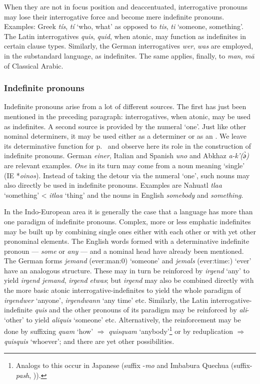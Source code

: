 When they are not in focus position and deaccentuated, interrogative pronouns may lose their interrogative force and become mere indefinite pronouns. Examples: Greek \textit{tís}, \textit{tí} ‘who, what’ as opposed to \textit{tis}, \textit{ti} ‘someone, something’. The Latin interrogatives \textit{quis}, \textit{quid}, when atonic, may function as indefinites in certain clause types. Similarly, the German interrogatives \textit{wer}, \textit{was} are employed, in the substandard language, as indefinites. The same applies, finally, to \textit{man}, \textit{m\=a} of Classical Arabic.

\subsubsection{Indefinite pronouns}
Indefinite pronouns arise from a lot of different sources. The first has just been mentioned in the preceding paragraph: interrogatives, when atonic, may be used as indefinites. A second source is provided by the numeral ‘one’. Just like other nominal determiners, it may be used either as a determiner or as an \np. We leave its determinative function for p.~\pageref{p56} and observe here its role in the construction of indefinite pronouns. German \textit{einer}, Italian and Spanish \textit{uno} and Abkhaz \textit{a-k'(\`ә)} are relevant examples. \textit{One} in its turn may come from a noun meaning ‘single’ (IE *\textit{oinos}). Instead of taking the detour via the numeral ‘one’, such nouns may also directly be used in indefinite pronouns. Examples are Nahuatl \textit{tlaa} ‘something’ {\textless} \textit{itlaa} ‘thing’ and the nouns in English \textit{somebody} and \textit{something}.

In the Indo-European area it is generally the case that a language has more than one paradigm of indefinite pronouns. Complex, more or less emphatic indefinites may be built up by combining single ones either with each other or with yet other pronominal elements. The English words formed with a determinative indefinite pronoun — \textit{some} or \textit{any} — and a nominal head have already been mentioned. The German forms \textit{jemand} (ever:man:0) ‘someone’ and \textit{jemals} (ever:time:\advr) ‘ever’ have an analogous structure. These may in turn be reinforced by \textit{irgend} ‘any’ to yield \textit{irgend jemand}, \textit{irgend etwas}; but \textit{irgend} may also be combined directly with the more basic atonic interrogative-indefinites to yield the whole paradigm of \textit{irgendwer} ‘anyone’, \textit{irgendwann} ‘any time’ etc. Similarly, the Latin interrogative-indefinite \textit{quis} and the other pronouns of its paradigm may be reinforced by \textit{ali}{}- ‘other’ to yield \textit{aliquis} ‘someone’ etc. Alternatively, the reinforcement may be done by suffixing \textit{quam} ‘how’ $\Rightarrow $ \textit{quisquam} ‘anybody’\footnote{Analogs to this occur in Japanese (suffix -\textit{mo} and Imbabura Quechua (suffix-\textit{pash}, \citealt[131]{Cole1982})).} or by reduplication $\Rightarrow $ \textit{quisquis} ‘whoever’; and there are yet other possibilities.

